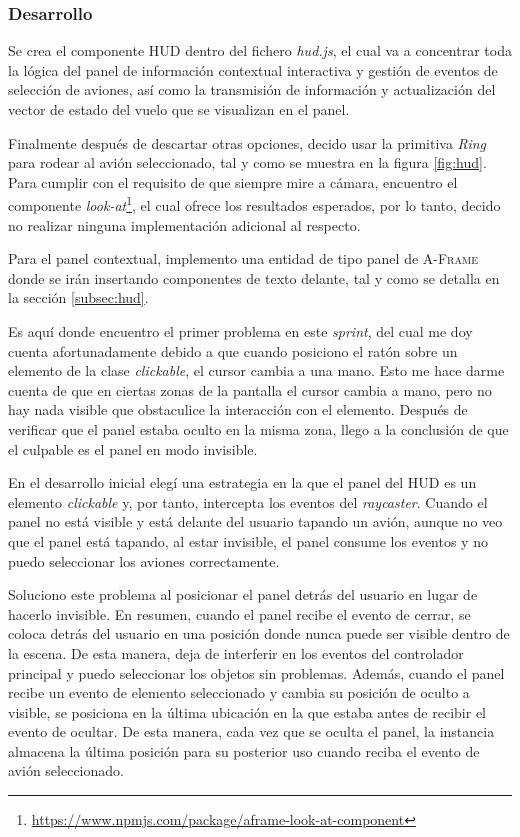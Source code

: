 \documentclass[a4paper, 11pt]{book}
\begin{document}
\subsubsection{Desarrollo}
Se crea el componente \textsc{\gls{HUD}} dentro del fichero \emph{hud.js}, el cual va a concentrar toda la lógica del panel de información contextual interactiva y gestión de eventos de selección de aviones, así como la transmisión de información y actualización del vector de estado del vuelo que se visualizan en el panel. 

Finalmente después de descartar otras opciones, decido usar la primitiva \emph{Ring} para rodear al avión seleccionado, tal y como se muestra en la figura \ref{fig:hud}. Para cumplir con el requisito de que siempre mire a cámara, encuentro el componente \emph{look-at}\footnote{\url{https://www.npmjs.com/package/aframe-look-at-component}}, el cual ofrece los resultados esperados, por lo tanto, decido no realizar ninguna implementación adicional al respecto.

Para el panel contextual, implemento una entidad de tipo panel de \textsc{A-Frame} donde se irán insertando componentes de texto delante, tal y como se detalla en la sección \ref{subsec:hud}. 

Es aquí donde encuentro el primer problema en este \emph{sprint}, del cual me doy  cuenta afortunadamente debido a que cuando posiciono el ratón sobre un elemento de la clase \emph{clickable}, el cursor cambia a una mano. Esto me hace darme cuenta de que en ciertas zonas de la pantalla el cursor cambia a mano, pero no hay nada visible que obstaculice la interacción con el elemento. Después de verificar que el panel estaba oculto en la misma zona, llego a la conclusión de que el culpable es el panel en modo invisible.

En el desarrollo inicial elegí una estrategia en la que el panel del \textsc{\gls{HUD}} es un elemento \emph{clickable} y, por tanto, intercepta los eventos del \emph{\gls{raycaster}}. Cuando el panel no está visible y está delante del usuario tapando un avión, aunque no veo que el panel está tapando, al estar invisible, el panel consume los eventos y no puedo seleccionar los aviones correctamente.

Soluciono este problema al posicionar el panel detrás del usuario en lugar de hacerlo invisible. En resumen, cuando el panel recibe el evento de cerrar, se coloca detrás del usuario en una posición donde nunca puede ser visible dentro de la escena. De esta manera, deja de interferir en los eventos del controlador principal y puedo seleccionar los objetos sin problemas.
Además, cuando el panel recibe un evento de elemento seleccionado y cambia su posición de oculto a visible, se posiciona en la última ubicación en la que estaba antes de recibir el evento de ocultar. De esta manera, cada vez que se oculta el panel, la instancia almacena la última posición para su posterior uso cuando reciba el evento de avión seleccionado.
\end{document}
